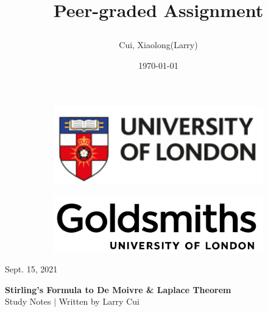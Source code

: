 \documentclass[11pt]{article}
\title{\vspace{-90pt} 



\textbf  {Peer-graded Assignment} }
\author{Cui, Xiaolong(Larry)}
\date{\today}
\begin{document}

\thispagestyle{plain}


\begin{figure}[H] %
  \begin{subfigure}{0.3\textwidth}
    \includegraphics[width=\textwidth]{uol}
  \end{subfigure}
  \hfill
  \begin{subfigure}{0.3\textwidth}
    \includegraphics[width=\textwidth]{goldsmiths}
  \end{subfigure}
\end{figure}


\begin{flushright}

\footnotesize {Sept. 15,   2021}
\end{flushright}

\begin{center}
\textbf{Stirling's Formula to De Moivre \& Laplace Theorem} \\
\footnotesize {Study Notes $ | $ Written by Larry Cui}
\end{center}

\end{document}
